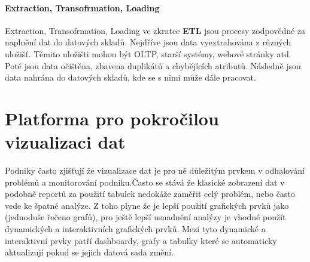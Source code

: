 \paragraph{Extraction, Transofrmation, Loading}
\par Extraction, Transofrmation, Loading ve zkratce \textbf{ETL} jsou procesy zodpovědné za naplnění dat do datových skladů. Nejdříve jsou data vyextrahována z různých uložišť. Těmito uložišti mohou být OLTP, starší systémy, webové stránky atd. Poté jsou data očištěna, zbavena duplikátů a chybějících atributů. Následně jsou data nahrána do datových skladů, kde se s nimi může dále pracovat.


\section{Platforma pro pokročilou vizualizaci dat}
\par Podniky často zjišťují že vizualizace dat je pro ně důležitým prvkem v odhalování problémů a monitorování podniku.Často se stává že klasické zobrazení dat v podobně reportů za použití tabulek nedokáže zaměřit celý problém, nebo často vede ke špatné analýze. Z toho plyne že je lepší použití grafických prvků jako (jednoduše řečeno grafů), pro ještě lepší usnadnění analýzy je vhodné použít dynamických a interaktivních grafických prvků. Mezi tyto dynamické a interaktivní prvky patří dashboardy, grafy a tabulky které se automaticky aktualizují pokud se jejich datová sada změní.

